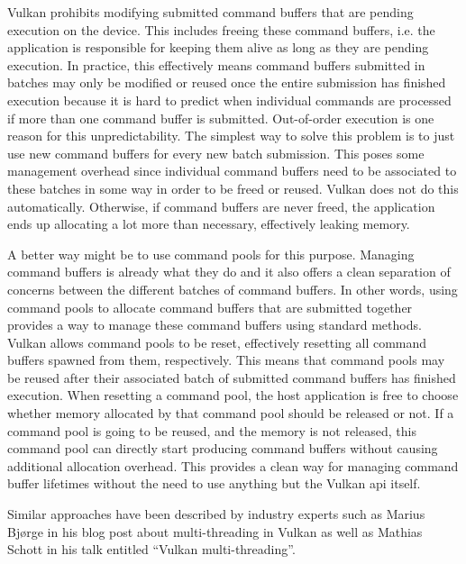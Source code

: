         Vulkan prohibits modifying submitted command buffers that are pending execution on the device.
        This includes freeing these command buffers, i.e. the application is responsible for keeping them alive as long as they are pending execution.
        In practice, this effectively means command buffers submitted in batches may only be modified or reused once the entire submission has finished execution because it is hard to predict when individual commands are processed if more than one command buffer is submitted.
        Out-of-order execution is one reason for this unpredictability.
        The simplest way to solve this problem is to just use new command buffers for every new batch submission.
        This poses some management overhead since individual command buffers need to be associated to these batches in some way in order to be freed or reused.
        Vulkan does not do this automatically.
        Otherwise, if command buffers are never freed, the application ends up allocating a lot more than necessary, effectively leaking memory.

        A better way might be to use command pools for this purpose.
        Managing command buffers is already what they do and it also offers a clean separation of concerns between the different batches of command buffers.
        In other words, using command pools to allocate command buffers that are submitted together provides a way to manage these command buffers using standard methods.
        Vulkan allows command pools to be reset, effectively resetting all command buffers spawned from them, respectively.
        This means that command pools may be reused after their associated batch of submitted command buffers has finished execution.
        When resetting a command pool, the host application is free to choose whether memory allocated by that command pool should be released or not.
        If a command pool is going to be reused, and the memory is not released, this command pool can directly start producing command buffers without causing additional allocation overhead.
        This provides a clean way for managing command buffer lifetimes without the need to use anything but the Vulkan \gls{api} itself.

        Similar approaches have been described by industry experts such as Marius Bjørge\cite{bjorge:multithreadingvulkan} in his blog post about multi-threading in Vulkan as well as Mathias Schott\cite{mschott:vulkan_multi_threading} in his talk entitled ``Vulkan multi-threading''.

